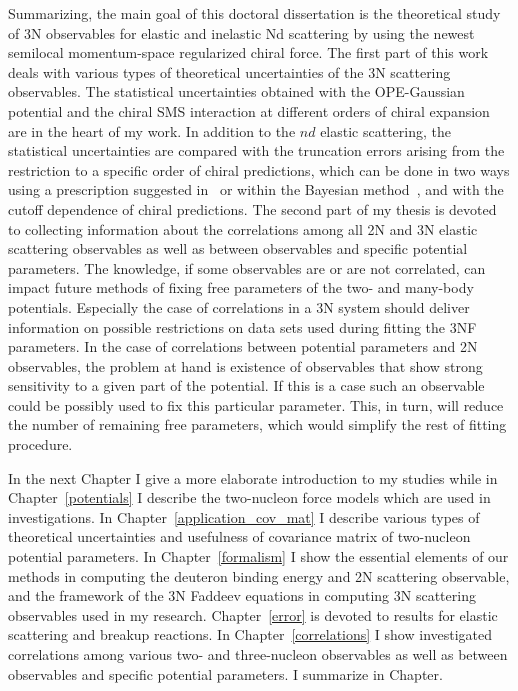 Summarizing, the main goal of this doctoral dissertation is the theoretical study of 3N observables for 
elastic and inelastic Nd scattering by using the newest semilocal momentum-space regularized 
chiral force. The first part of this work deals with various types of theoretical uncertainties of the 3N scattering observables. The statistical uncertainties obtained with the OPE-Gaussian potential and the chiral SMS interaction at different orders of chiral expansion are in the heart of my work. In addition to the $nd$ elastic scattering, the statistical uncertainties are compared with the truncation errors arising from the restriction to a specific order of chiral predictions, which can be done in two ways using a prescription suggested in~\cite{binder2016few, binder2018few} or within the Bayesian method~\cite{melendez2017bayesian}, and with the cutoff dependence of chiral predictions.
The second part of my thesis is devoted to collecting information about the correlations among all 2N and 3N elastic scattering observables as well as between observables and specific potential parameters. The knowledge, if some observables are or are not correlated, can impact future methods of fixing free parameters of the two- and many-body potentials. Especially the case of correlations in a 3N system should deliver information on possible restrictions on data sets used during fitting the 3NF parameters. In the case of correlations between potential parameters and 2N observables, the problem at hand is existence of observables that show strong sensitivity to a given part of the potential. If this is a case such an observable could be possibly used to fix this particular parameter. This, in turn, will reduce the number of remaining free parameters, which would simplify the rest of fitting procedure.

In the next Chapter I give a more elaborate introduction to my studies while in Chapter~\ref{potentials} I describe the two-nucleon force models which are used in investigations. In Chapter~\ref{application_cov_mat} I describe various types of theoretical uncertainties and usefulness of covariance matrix of two-nucleon potential parameters. In Chapter~\ref{formalism} I show the essential elements of our methods in computing the deuteron binding energy and 2N scattering observable, and the framework of the 3N Faddeev equations in computing 3N scattering observables used in my research. Chapter~\ref{error} is devoted to results for elastic scattering and breakup reactions. In Chapter~\ref{correlations} I show investigated correlations among various two- and three-nucleon observables as well as between observables and specific potential parameters. I summarize in Chapter.


